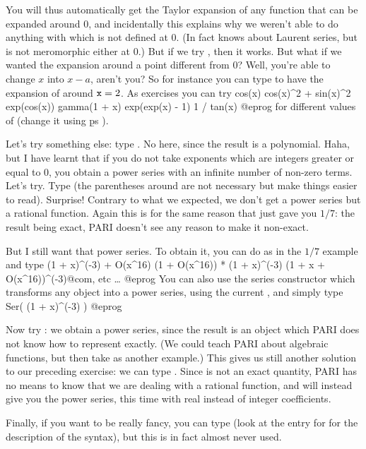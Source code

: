You will thus automatically get the Taylor expansion of any function that can
be expanded around $0$, and incidentally this explains why we weren't
able to do anything with  which is not defined at $0$. (In fact
 knows about Laurent series, but  is not meromorphic
either at $0$.) But if we try , then it works. But what if we
wanted the expansion around a point different from 0? Well, you're able to
change $x$ into $x-a$, aren't you? So for instance you can type
 to have the expansion of  around ${\tt x}=2$. As
exercises you can try
\bprog
cos(x)
cos(x)^2 + sin(x)^2
exp(cos(x))
gamma(1 + x)
exp(exp(x) - 1)
1 / tan(x) @eprog
\noindent for different values of  (change it using \b{ps}
).

Let's try something else: type . No  here, since
the result is a polynomial.  Haha, but I have learnt that if you do not take
exponents which are integers greater or equal to 0, you obtain a power series
with an infinite number of non-zero terms. Let's try.  Type
 (the parentheses around  are not necessary but
make things easier to read). Surprise! Contrary to what we expected, we don't
get a power series but a rational function. Again this is for the same reason
that  just gave you $1/7$: the result being exact, PARI doesn't see
any reason to make it non-exact.

But I still want that power series. To obtain it, you can do as in the $1/7$
example and type
\bprog
(1 + x)^(-3) + O(x^16)
(1 + O(x^16)) * (1 + x)^(-3)
(1 + x + O(x^16))^(-3)@com, etc \dots
@eprog
You can also use the series constructor which transforms any object into a
power series, using the current , and simply type
\bprog
Ser( (1 + x)^(-3) )
@eprog

Now try : we obtain a power series, since the
result is an object which PARI does not know how to represent exactly. (We
could teach PARI about algebraic functions, but then take 
as another example.) This gives us still another solution to our preceding
exercise: we can type . Since  is not an exact
quantity, PARI has no means to know that we are dealing with a rational
function, and will instead give you the power series, this time with real
instead of integer coefficients.

Finally, if you want to be really fancy, you can type
 (look at the entry for  for the
description of the syntax), but this is in fact almost never used.
\smallskip

